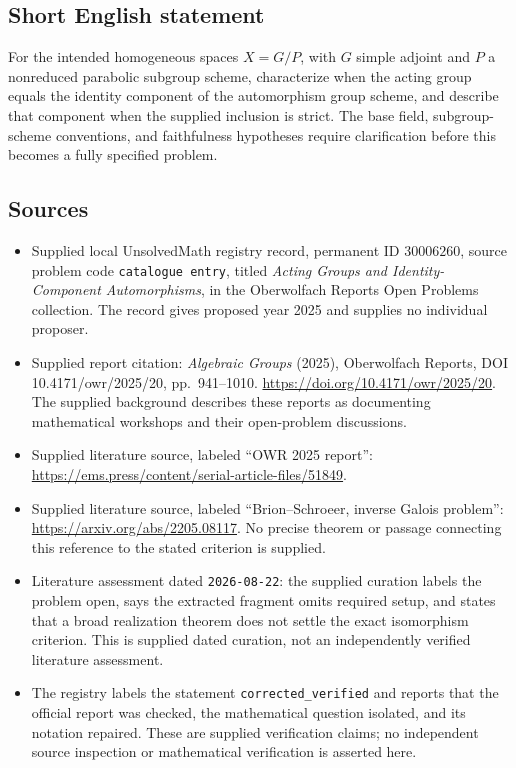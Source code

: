 \documentclass[11pt]{article}
\begin{document}
\subsection{Short English statement}
For the intended homogeneous spaces \(X=G/P\), with \(G\) simple adjoint and \(P\) a nonreduced parabolic subgroup scheme, characterize when the acting group equals the identity component of the automorphism group scheme, and describe that component when the supplied inclusion is strict. The base field, subgroup-scheme conventions, and faithfulness hypotheses require clarification before this becomes a fully specified problem.
\subsection{Sources}
\begin{itemize}
\item Supplied local UnsolvedMath registry record, permanent ID \(30006260\), source problem code \texttt{catalogue entry}, titled \emph{Acting Groups and Identity-Component Automorphisms}, in the Oberwolfach Reports Open Problems collection. The record gives proposed year 2025 and supplies no individual proposer.
\item Supplied report citation: \emph{Algebraic Groups} (2025), Oberwolfach Reports, DOI 10.4171/owr/2025/20, pp.\ 941--1010. \url{https://doi.org/10.4171/owr/2025/20}. The supplied background describes these reports as documenting mathematical workshops and their open-problem discussions.
\item Supplied literature source, labeled ``OWR 2025 report'': \url{https://ems.press/content/serial-article-files/51849}.
\item Supplied literature source, labeled ``Brion--Schroeer, inverse Galois problem'': \url{https://arxiv.org/abs/2205.08117}. No precise theorem or passage connecting this reference to the stated criterion is supplied.
\item Literature assessment dated \texttt{2026-08-22}: the supplied curation labels the problem open, says the extracted fragment omits required setup, and states that a broad realization theorem does not settle the exact isomorphism criterion. This is supplied dated curation, not an independently verified literature assessment.
\item The registry labels the statement \texttt{corrected\_verified} and reports that the official report was checked, the mathematical question isolated, and its notation repaired. These are supplied verification claims; no independent source inspection or mathematical verification is asserted here.
\end{itemize}
\end{document}
